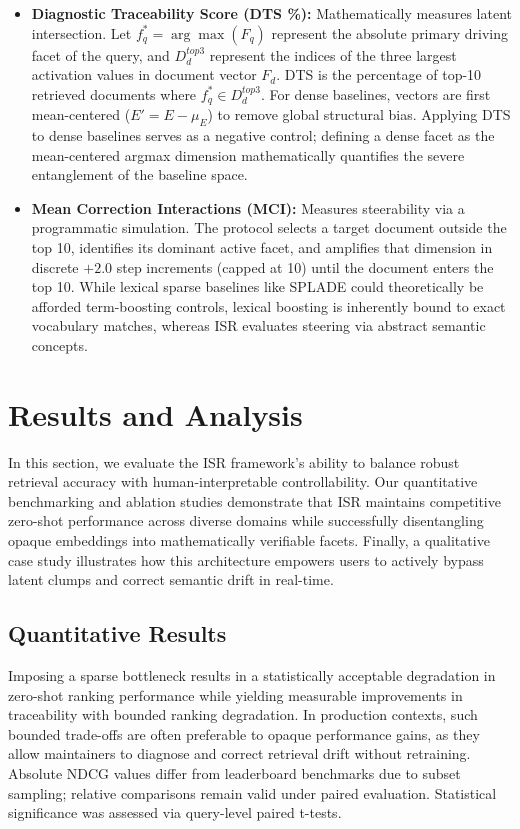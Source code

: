 \documentclass[sigconf,authordraft]{acmart}
\begin{document}
\begin{itemize}
    \item \textbf{Diagnostic Traceability Score (DTS \%):} Mathematically measures latent intersection. Let $f_q^* = \arg\max(F_q)$ represent the absolute primary driving facet of the query, and $D_d^{top3}$ represent the indices of the three largest activation values in document vector $F_d$. DTS is the percentage of top-10 retrieved documents where $f_q^* \in D_d^{top3}$. For dense baselines, vectors are first mean-centered ($E' = E - \mu_E$) to remove global structural bias. Applying DTS to dense baselines serves as a negative control; defining a dense facet as the mean-centered argmax dimension mathematically quantifies the severe entanglement of the baseline space.
    \item \textbf{Mean Correction Interactions (MCI):} Measures steerability via a programmatic simulation. The protocol selects a target document outside the top 10, identifies its dominant active facet, and amplifies that dimension in discrete $+2.0$ step increments (capped at 10) until the document enters the top 10. While lexical sparse baselines like SPLADE could theoretically be afforded term-boosting controls, lexical boosting is inherently bound to exact vocabulary matches, whereas ISR evaluates steering via abstract semantic concepts.
\end{itemize}

\section{Results and Analysis}
In this section, we evaluate the ISR framework's ability to balance robust retrieval accuracy with human-interpretable controllability. Our quantitative benchmarking and ablation studies demonstrate that ISR maintains competitive zero-shot performance across diverse domains while successfully disentangling opaque embeddings into mathematically verifiable facets. Finally, a qualitative case study illustrates how this architecture empowers users to actively bypass latent clumps and correct semantic drift in real-time.

\subsection{Quantitative Results}
Imposing a sparse bottleneck results in a statistically acceptable degradation in zero-shot ranking performance while yielding measurable improvements in traceability with bounded ranking degradation. In production contexts, such bounded trade-offs are often preferable to opaque performance gains, as they allow maintainers to diagnose and correct retrieval drift without retraining. Absolute NDCG values differ from leaderboard benchmarks due to subset sampling; relative comparisons remain valid under paired evaluation. Statistical significance was assessed via query-level paired t-tests.
\end{document}
